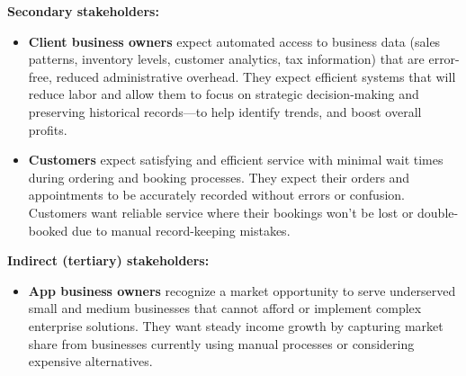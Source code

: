 \documentclass[]{VUMIFTemplateClass}
\begin{document}
\textbf{Secondary stakeholders:}
\begin{itemize}
    \item \textbf{Client business owners} expect automated access to business
    data (sales patterns, inventory levels, customer analytics, tax information)
    that are error-free, reduced administrative overhead. They expect efficient
    systems that will reduce labor and allow them to focus on strategic
    decision-making and preserving historical records—to help identify trends,
    and boost overall profits.
    
    \item \textbf{Customers} expect satisfying and efficient service with minimal wait
    times during ordering and booking processes. They expect their orders and
    appointments to be accurately recorded without errors or confusion.
    Customers want reliable service where their bookings won't be lost
    or double-booked due to manual record-keeping mistakes.

\end{itemize}

\textbf{Indirect (tertiary) stakeholders:}
\begin{itemize}
    \item \textbf{App business owners} recognize a market opportunity to serve
    underserved small and medium businesses that cannot afford or implement
    complex enterprise solutions. They want steady income growth by capturing
    market share from businesses currently using manual processes or considering
    expensive alternatives.


\end{itemize}
\end{document}
